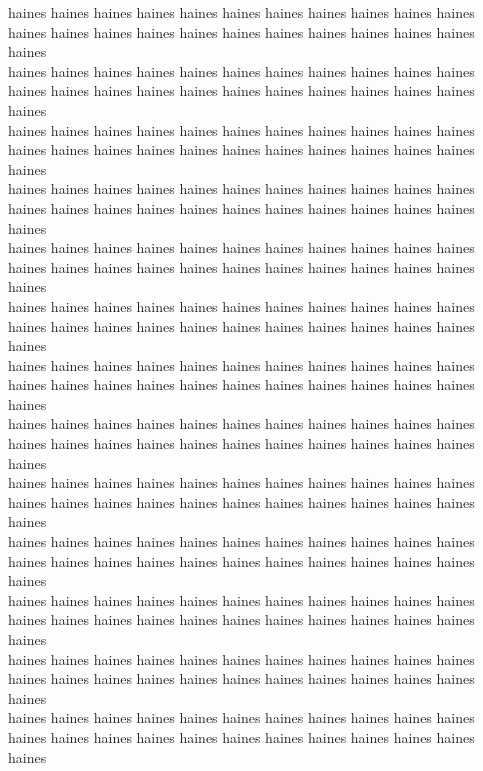 haines haines haines haines haines haines haines haines haines haines haines haines haines haines haines haines haines haines haines haines haines haines haines\\
haines haines haines haines haines haines haines haines haines haines haines haines haines haines haines haines haines haines haines haines haines haines haines\\
haines haines haines haines haines haines haines haines haines haines haines haines haines haines haines haines haines haines haines haines haines haines haines\\
haines haines haines haines haines haines haines haines haines haines haines haines haines haines haines haines haines haines haines haines haines haines haines\\
haines haines haines haines haines haines haines haines haines haines haines haines haines haines haines haines haines haines haines haines haines haines haines\\
haines haines haines haines haines haines haines haines haines haines haines haines haines haines haines haines haines haines haines haines haines haines haines\\
haines haines haines haines haines haines haines haines haines haines haines haines haines haines haines haines haines haines haines haines haines haines haines\\
haines haines haines haines haines haines haines haines haines haines haines haines haines haines haines haines haines haines haines haines haines haines haines\\
haines haines haines haines haines haines haines haines haines haines haines haines haines haines haines haines haines haines haines haines haines haines haines\\
haines haines haines haines haines haines haines haines haines haines haines haines haines haines haines haines haines haines haines haines haines haines haines\\
haines haines haines haines haines haines haines haines haines haines haines haines haines haines haines haines haines haines haines haines haines haines haines\\
haines haines haines haines haines haines haines haines haines haines haines haines haines haines haines haines haines haines haines haines haines haines haines\\
haines haines haines haines haines haines haines haines haines haines haines haines haines haines haines haines haines haines haines haines haines haines haines\\
